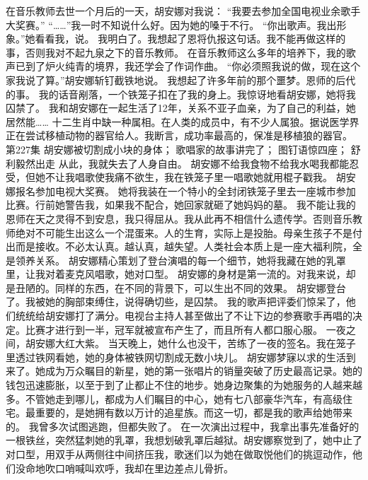 \documentclass[a4paper,12pt,UTF8,twoside]{ctexbook}
\begin{document}
        在音乐教师去世一个月后的一天，胡安娜对我说： 
        “我要去参加全国电视业余歌手大奖赛。” 
        “……”我一时不知说什么好。因为她的嗓于不行。 
        “你出歌声。我出形象。”她看看我，说。 
        我明白了。我想起了恩将仇报这句话。我不能再做这样的事，否则我对不起九泉之下的音乐教师。 
        在音乐教师这么多年的培养下，我的歌声已到了炉火纯青的境界，我还学会了作词作曲。 
        “你必须照我说的做，现在这个家我说了算。”胡安娜斩钉截铁地说。 
        我想起了许多年前的那个噩梦。恩师的后代的事。 
        我的话音剐落，一个铁笼子扣在了我的身上。我惊讶地看胡安娜，她将我囚禁了。 
        我和胡安娜在一起生活了12年，关系不亚子血亲，为了自己的利益，她居然能…… 
        十二生肖中缺一种属相。在人类的成员中，有不少人属狼。据说医学界正在尝试移植动物的器官给人。我断言，成功率最高的，保准是移植狼的器官。   第227集 
        胡安娜被切割成小块的身体； 
        歌唱家的故事讲完了； 
        图钉语惊四座； 
        舒利毅然出走   
        从此，我就失去了人身自由。 
        胡安娜不给我食物不给我水喝我都能忍受，但她不让我唱歌使我痛不欲生，我在铁笼子里一唱歌她就用棍子戳我。 
        胡安娜报名参加电视大奖赛。 
        她将我装在一个特小的全封闭铁笼子里去一座城市参加比赛。行前她警告我，如果我不配合，她回家就砸了她妈妈的墓。 
        我不能让我的恩师在天之灵得不到安息，我只得屈从。我从此再不相信什么遗传学。否则音乐教师绝对不可能生出这么一个混蛋来。人的生育，实际上是投胎。母亲生孩子不是付出而是接收。不必太认真。越认真，越失望。人类社会本质上是一座大福利院，全是领养关系。 
        胡安娜精心策划了登台演唱的每一个细节，她将我藏在她的乳罩里，让我对着麦克风唱歌，她对口型。 
        胡安娜的身材是第一流的。对我来说，却是丑陋的。同样的东西，在不同的背景下，可以生出不同的效果。 
        胡安娜登台了。我被她的胸部束缚住，说得确切些，是囚禁。 
        我的歌声把评委们惊呆了，他们统统给胡安娜打了满分。电视台主持人甚至做出了不让下边的参赛歌手再唱的决定。比赛才进行到一半，冠军就被宣布产生了，而且所有人都口服心服。 
        一夜之间，胡安娜大红大紫。 
        当天晚上，她什么也没干，苦练了一夜的签名。我在笼子里透过铁网看她，她的身体被铁网切割成无数小块儿。 
        胡安娜梦寐以求的生活到来了。她成为万众瞩目的新星，她的第一张唱片的销量突破了历史最高记录。她的钱包迅速膨胀，以至于到了止都止不住的地步。她身边聚集的为她服务的人越来越多。不管她走到哪儿，都成为人们瞩目的中心，她有七八部豪华汽车，有高级住宅。最重要的，是她拥有数以万计的追星族。而这一切，都是我的歌声给她带来的。 
        我曾多次试图逃跑，但都失败了。 
        在一次演出过程中，我拿出事先准备好的一根铁丝，突然猛刺她的乳罩，我想划破乳罩后越狱。胡安娜察觉到了，她中止了对口型，用双手从两侧往中间挤压我，歌迷们以为她在做取悦他们的挑逗动作，他们没命地吹口哨喊叫欢呼，我却在里边差点儿骨折。 
\end{document}
